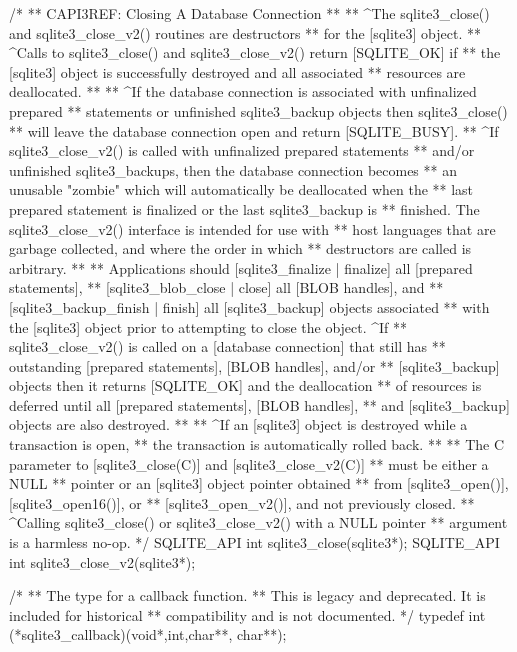 \begin{Codex}[label=sqlite3.h,numbers=left]
{/*
** CAPI3REF: Closing A Database Connection
**
** ^The sqlite3_close() and sqlite3_close_v2() routines are destructors
** for the [sqlite3] object.
** ^Calls to sqlite3_close() and sqlite3_close_v2() return [SQLITE_OK] if
** the [sqlite3] object is successfully destroyed and all associated
** resources are deallocated.
**
** ^If the database connection is associated with unfinalized prepared
** statements or unfinished sqlite3_backup objects then sqlite3_close()
** will leave the database connection open and return [SQLITE_BUSY].
** ^If sqlite3_close_v2() is called with unfinalized prepared statements
** and/or unfinished sqlite3_backups, then the database connection becomes
** an unusable "zombie" which will automatically be deallocated when the
** last prepared statement is finalized or the last sqlite3_backup is
** finished.  The sqlite3_close_v2() interface is intended for use with
** host languages that are garbage collected, and where the order in which
** destructors are called is arbitrary.
**
** Applications should [sqlite3_finalize | finalize] all [prepared statements],
** [sqlite3_blob_close | close] all [BLOB handles], and 
** [sqlite3_backup_finish | finish] all [sqlite3_backup] objects associated
** with the [sqlite3] object prior to attempting to close the object.  ^If
** sqlite3_close_v2() is called on a [database connection] that still has
** outstanding [prepared statements], [BLOB handles], and/or
** [sqlite3_backup] objects then it returns [SQLITE_OK] and the deallocation
** of resources is deferred until all [prepared statements], [BLOB handles],
** and [sqlite3_backup] objects are also destroyed.
**
** ^If an [sqlite3] object is destroyed while a transaction is open,
** the transaction is automatically rolled back.
**
** The C parameter to [sqlite3_close(C)] and [sqlite3_close_v2(C)]
** must be either a NULL
** pointer or an [sqlite3] object pointer obtained
** from [sqlite3_open()], [sqlite3_open16()], or
** [sqlite3_open_v2()], and not previously closed.
** ^Calling sqlite3_close() or sqlite3_close_v2() with a NULL pointer
** argument is a harmless no-op.
*/
SQLITE_API int sqlite3_close(sqlite3*);
SQLITE_API int sqlite3_close_v2(sqlite3*);

/*
** The type for a callback function.
** This is legacy and deprecated.  It is included for historical
** compatibility and is not documented.
*/
typedef int (*sqlite3_callback)(void*,int,char**, char**);

}
\end{Codex}
